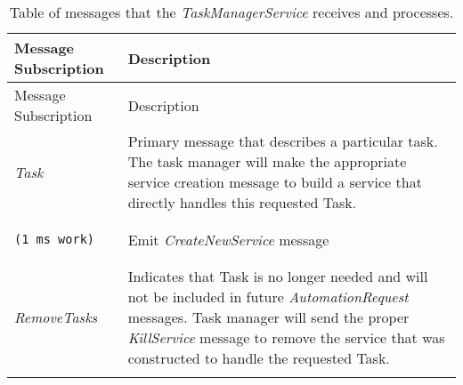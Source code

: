 \begin{longtable}[c]{@{}ll@{}}
\caption{Table of messages that the \emph{TaskManagerService} receives
and processes.}\tabularnewline
\toprule
\begin{minipage}[b]{0.29\columnwidth}\raggedright\strut
Message Subscription
\strut\end{minipage} &
\begin{minipage}[b]{0.65\columnwidth}\raggedright\strut
Description
\strut\end{minipage}\tabularnewline
\midrule
\endfirsthead
\toprule
\begin{minipage}[b]{0.29\columnwidth}\raggedright\strut
Message Subscription
\strut\end{minipage} &
\begin{minipage}[b]{0.65\columnwidth}\raggedright\strut
Description
\strut\end{minipage}\tabularnewline
\midrule
\endhead
\begin{minipage}[t]{0.29\columnwidth}\raggedright\strut
\emph{Task}
\strut\end{minipage} &
\begin{minipage}[t]{0.65\columnwidth}\raggedright\strut
Primary message that describes a particular task. The task manager will
make the appropriate service creation message to build a service that
directly handles this requested Task.
\strut\end{minipage}\tabularnewline
\begin{minipage}[t]{0.29\columnwidth}\raggedright\strut
\begin{verbatim}
(1 ms work)
\end{verbatim}
\strut\end{minipage} &
\begin{minipage}[t]{0.65\columnwidth}\raggedright\strut
Emit \emph{CreateNewService} message
\strut\end{minipage}\tabularnewline
\begin{minipage}[t]{0.29\columnwidth}\raggedright\strut
\emph{RemoveTasks}
\strut\end{minipage} &
\begin{minipage}[t]{0.65\columnwidth}\raggedright\strut
Indicates that Task is no longer needed and will not be included in
future \emph{AutomationRequest} messages. Task manager will send the
proper \emph{KillService} message to remove the service that was
constructed to handle the requested Task.
\strut\end{minipage}\tabularnewline
\begin{minipage}[t]{0.29\columnwidth}\raggedright\strut

\end{minipage}
\end{longtable}
